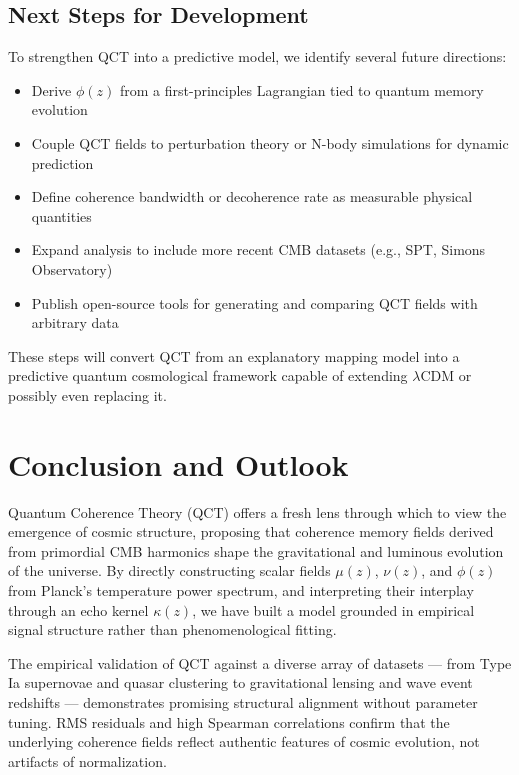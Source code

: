 \documentclass[12pt]{article}
\begin{document}
	\subsection*{Next Steps for Development}
	To strengthen QCT into a predictive model, we identify several future directions:
	\begin{itemize}
		\item Derive \( \phi(z) \) from a first-principles Lagrangian tied to quantum memory evolution
		\item Couple QCT fields to perturbation theory or N-body simulations for dynamic prediction
		\item Define coherence bandwidth or decoherence rate as measurable physical quantities
		\item Expand analysis to include more recent CMB datasets (e.g., SPT, Simons Observatory)
		\item Publish open-source tools for generating and comparing QCT fields with arbitrary data
	\end{itemize}
	
	These steps will convert QCT from an explanatory mapping model into a predictive quantum cosmological framework capable of extending $\lambda$CDM or possibly even replacing it.
	
	
	\section{Conclusion and Outlook}

	Quantum Coherence Theory (QCT) offers a fresh lens through which to view the emergence of cosmic structure, proposing that coherence memory fields derived from primordial CMB harmonics shape the gravitational and luminous evolution of the universe. By directly constructing scalar fields \( \mu(z) \), \( \nu(z) \), and \( \phi(z) \) from Planck's temperature power spectrum, and interpreting their interplay through an echo kernel \( \kappa(z) \), we have built a model grounded in empirical signal structure rather than phenomenological fitting.

	The empirical validation of QCT against a diverse array of datasets — from Type Ia supernovae and quasar clustering to gravitational lensing and wave event redshifts — demonstrates promising structural alignment without parameter tuning. RMS residuals and high Spearman correlations confirm that the underlying coherence fields reflect authentic features of cosmic evolution, not artifacts of normalization.
\end{document}
